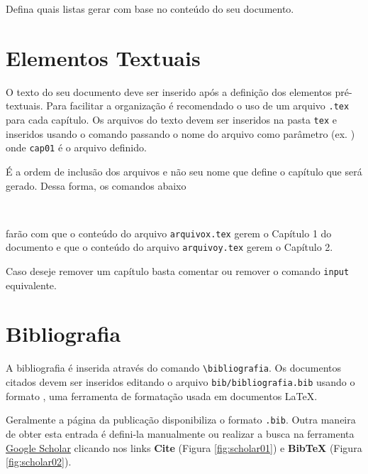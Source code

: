 Defina quais listas gerar com base no conteúdo do seu documento.

\section{Elementos Textuais}
\label{sec:textuais}

O texto do seu documento deve ser inserido após a definição dos elementos pré-textuais. Para facilitar a organização é recomendado o uso de um arquivo \verb|.tex| para cada capítulo. Os arquivos do texto devem ser inseridos na pasta \verb|tex| e inseridos usando o comando \verb|| passando o nome do arquivo como parâmetro (ex. \verb||) onde \verb|cap01| é o arquivo definido.

É a ordem de inclusão dos arquivos e não seu nome que define o capítulo que será gerado. Dessa forma, os comandos abaixo

\begin{Verbatim}


\end{Verbatim}

farão com que o conteúdo do arquivo \verb|arquivox.tex| gerem o Capítulo 1 do documento e que o conteúdo do arquivo \verb|arquivoy.tex| gerem o Capítulo 2. 

Caso deseje remover um capítulo basta comentar ou remover o comando \verb|input| equivalente.

\section{Bibliografia}
\label{sec:bib}

A bibliografia é inserida através do comando \verb|\bibliografia|. Os documentos citados devem ser inseridos editando o arquivo \verb|bib/bibliografia.bib| usando o formato \BibTeX, uma ferramenta de formatação usada em documentos \LaTeX. 

Geralmente a página da publicação disponibiliza o formato \verb|.bib|. Outra maneira de obter esta entrada é defini-la manualmente ou realizar a busca na ferramenta \href{https://scholar.google.com}{Google Scholar} clicando nos links \textbf{Cite} (Figura \ref{fig:scholar01}) e \textbf{BibTeX} (Figura \ref{fig:scholar02}). 

